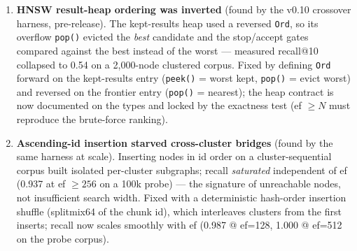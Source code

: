 \begin{enumerate}[itemsep=3pt]
timestamp --- whose effective granularity on Windows let two parallel tests
open the same fresh scratch file and migrate it concurrently, failing with
\texttt{duplicate column name: knowledge\_json}. A crash between batches
could likewise leave a fully-migrated library with a stale stamp that could
never reopen. Fixed in three layers: per-batch version stamps;
signature-column self-healing (a batch whose signature column already exists
is skipped, recovering stale-stamped databases); and process-unique scratch
paths (pid + atomic counter). Regression-tested
(\texttt{migration\_self\_heals\_when\_version\_stamp\_lags},
\texttt{parallel\_in\_memory\_engines\_are\_isolated}).
\item \textbf{HNSW result-heap ordering was inverted} (found by the v0.10
crossover harness, pre-release). The kept-results heap used a reversed
\texttt{Ord}, so its overflow \texttt{pop()} evicted the \emph{best} candidate
and the stop/accept gates compared against the best instead of the worst ---
measured recall@10 collapsed to 0.54 on a 2,000-node clustered corpus. Fixed
by defining \texttt{Ord} forward on the kept-results entry (\texttt{peek()} =
worst kept, \texttt{pop()} = evict worst) and reversed on the frontier entry
(\texttt{pop()} = nearest); the heap contract is now documented on the types
and locked by the exactness test (ef $\geq N$ must reproduce the brute-force
ranking).
\item \textbf{Ascending-id insertion starved cross-cluster bridges} (found by
the same harness at scale). Inserting nodes in id order on a
cluster-sequential corpus built isolated per-cluster subgraphs; recall
\emph{saturated} independent of ef (0.937 at ef $\geq 256$ on a 100k probe) ---
the signature of unreachable nodes, not insufficient search width. Fixed with
a deterministic hash-order insertion shuffle (splitmix64 of the chunk id),
which interleaves clusters from the first inserts; recall now scales smoothly
with ef (0.987 @ ef=128, 1.000 @ ef=512 on the probe corpus).
\end{enumerate}
